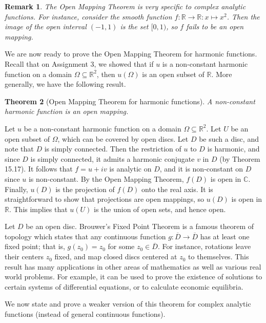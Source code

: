 \documentclass[10pt]{article}
\makeatletter
\newcommand{\R}{\mathbb{R}}
\newcommand{\C}{\mathbb{C}}
\theoremstyle{newstyle}
\newtheorem{thm}{Theorem}[section]
\newtheorem{remark}[thm]{Remark}
\newenvironment{pf}[1][\proofname]{\par
  \pushQED{\qed}%
  \normalfont \topsep0\p@\relax
  \trivlist
  \item[\hskip\labelsep\scshape
  #1\@addpunct{.}]\ignorespaces
}{%
  \popQED\endtrivlist\@endpefalse
}
\makeatother
\begin{document}
\begin{remark}
The Open Mapping Theorem is very specific to complex analytic functions. For instance, consider the 
smooth function $f : \R \to \R : x \mapsto x^2$. Then the image of the open interval $(-1, 1)$ is the 
set $[0, 1)$, so $f$ fails to be an open mapping. 
\end{remark}

We are now ready to prove the Open Mapping Theorem for harmonic functions. Recall that on Assignment 3,
we showed that if $u$ is a non-constant harmonic function on a domain $\Omega \subseteq \R^2$, 
then $u(\Omega)$ is an open subset of $\R$. More generally, we have the following result.

\begin{thm}[Open Mapping Theorem for harmonic functions]
A non-constant harmonic function is an open mapping. 
\end{thm}
\begin{pf}
Let $u$ be a non-constant harmonic function on a domain $\Omega \subseteq \R^2$. Let $U$ 
be an open subset of $\Omega$, which can be covered by open discs. Let $D$ be such a disc, 
and note that $D$ is simply connected. Then the restriction of $u$ to $D$ is harmonic, 
and since $D$ is simply connected, it admits a harmonic conjugate $v$ in $D$ (by Theorem 15.17). 
It follows that $f = u + iv$ is analytic on $D$, and it is non-constant on $D$ since $u$ 
is non-constant. By the Open Mapping Theorem, $f(D)$ is open in $\C$. Finally, $u(D)$ is the projection 
of $f(D)$ onto the real axis. It is straightforward to show that projections are open mappings, 
so $u(D)$ is open in $\R$. This implies that $u(U)$ is the union of open sets, and hence open. 
\end{pf}

Let $D$ be an open disc. Brouwer's Fixed Point Theorem is a famous theorem of topology which 
states that any continuous function $g : \overline{D} \to \overline{D}$ has at least one fixed 
point; that is, $g(z_0) = z_0$ for some $z_0 \in \overline{D}$. For instance, rotations 
leave their centers $z_0$ fixed, and map closed discs centered at $z_0$ to themselves. 
This result has many applications in other areas of mathematics as well as various real world 
problems. For example, it can be used to prove the existence of solutions to certain systems of
differential equations, or to calculate economic equilibria. 

We now state and prove a weaker version of this theorem for complex analytic functions (instead of 
general continuous functions). 
\end{document}
